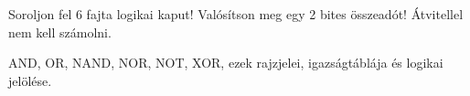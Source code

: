 \begin{example2}

Soroljon fel 6 fajta logikai kaput! Valósítson meg egy 2 bites összeadót! Átvitellel nem kell számolni.


\end{example2}

AND, OR, NAND, NOR, NOT, XOR, ezek rajzjelei, igazságtáblája és logikai jelölése.